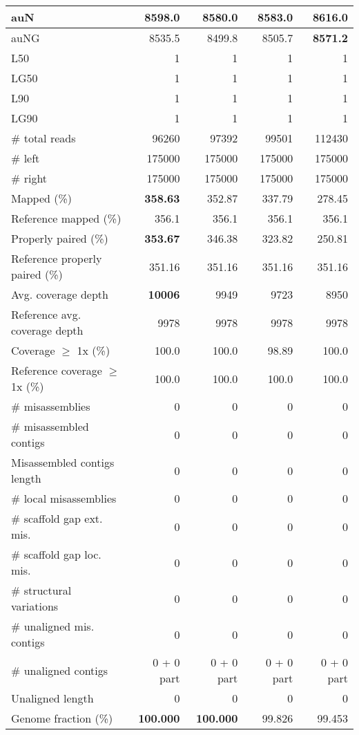 \documentclass[12pt,a4paper]{article}
\begin{document}
\begin{table}[ht]
\begin{center}
\begin{tabular}{|l*{4}{|r}|}
auN & 8598.0 & 8580.0 & 8583.0 & {\bf 8616.0} \\ \hline
auNG & 8535.5 & 8499.8 & 8505.7 & {\bf 8571.2} \\ \hline
L50 & 1 & 1 & 1 & 1 \\ \hline
LG50 & 1 & 1 & 1 & 1 \\ \hline
L90 & 1 & 1 & 1 & 1 \\ \hline
LG90 & 1 & 1 & 1 & 1 \\ \hline
\# total reads & 96260 & 97392 & 99501 & 112430 \\ \hline
\# left & 175000 & 175000 & 175000 & 175000 \\ \hline
\# right & 175000 & 175000 & 175000 & 175000 \\ \hline
Mapped (\%) & {\bf 358.63} & 352.87 & 337.79 & 278.45 \\ \hline
Reference mapped (\%) & 356.1 & 356.1 & 356.1 & 356.1 \\ \hline
Properly paired (\%) & {\bf 353.67} & 346.38 & 323.82 & 250.81 \\ \hline
Reference properly paired (\%) & 351.16 & 351.16 & 351.16 & 351.16 \\ \hline
Avg. coverage depth & {\bf 10006} & 9949 & 9723 & 8950 \\ \hline
Reference avg. coverage depth & 9978 & 9978 & 9978 & 9978 \\ \hline
Coverage $\geq$ 1x (\%) & 100.0 & 100.0 & 98.89 & 100.0 \\ \hline
Reference coverage $\geq$ 1x (\%) & 100.0 & 100.0 & 100.0 & 100.0 \\ \hline
\# misassemblies & 0 & 0 & 0 & 0 \\ \hline
\# misassembled contigs & 0 & 0 & 0 & 0 \\ \hline
Misassembled contigs length & 0 & 0 & 0 & 0 \\ \hline
\# local misassemblies & 0 & 0 & 0 & 0 \\ \hline
\# scaffold gap ext. mis. & 0 & 0 & 0 & 0 \\ \hline
\# scaffold gap loc. mis. & 0 & 0 & 0 & 0 \\ \hline
\# structural variations & 0 & 0 & 0 & 0 \\ \hline
\# unaligned mis. contigs & 0 & 0 & 0 & 0 \\ \hline
\# unaligned contigs & 0 + 0 part & 0 + 0 part & 0 + 0 part & 0 + 0 part \\ \hline
Unaligned length & 0 & 0 & 0 & 0 \\ \hline
Genome fraction (\%) & {\bf 100.000} & {\bf 100.000} & 99.826 & 99.453 \\ \hline

\end{tabular}
\end{center}
\end{table}
\end{document}

